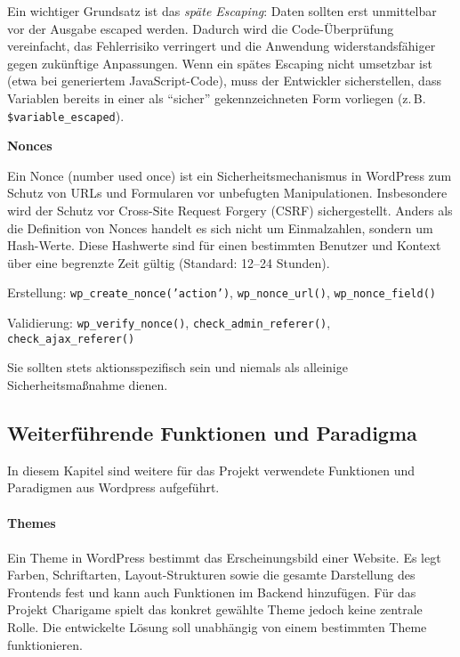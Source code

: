 Ein wichtiger Grundsatz ist das \emph{späte Escaping}: Daten sollten erst unmittelbar vor der Ausgabe escaped werden.
Dadurch wird die Code-Überprüfung vereinfacht, das Fehlerrisiko verringert und die Anwendung widerstandsfähiger gegen zukünftige Anpassungen.
Wenn ein spätes Escaping nicht umsetzbar ist (etwa bei generiertem JavaScript-Code), muss der Entwickler sicherstellen, dass Variablen bereits in einer als \enquote{sicher} gekennzeichneten Form vorliegen (z.\,B. \texttt{\$variable\_escaped}).

\textbf{Nonces}

Ein Nonce (number used once) ist ein Sicherheitsmechanismus in WordPress zum Schutz von URLs und Formularen vor unbefugten Manipulationen.
Insbesondere wird der Schutz vor Cross-Site Request Forgery (CSRF) sichergestellt.
Anders als die Definition von Nonces handelt es sich nicht um Einmalzahlen, sondern um Hash-Werte.
Diese Hashwerte sind für einen bestimmten Benutzer und Kontext über eine begrenzte Zeit gültig (Standard: 12–24 Stunden).

Erstellung: \texttt{wp\_create\_nonce('action')}, \texttt{wp\_nonce\_url()}, \texttt{wp\_nonce\_field()}

Validierung: \texttt{wp\_verify\_nonce()}, \texttt{check\_admin\_referer()}, \texttt{check\_ajax\_referer()}

Sie sollten stets aktionsspezifisch sein und niemals als alleinige Sicherheitsmaßnahme dienen.




\subsection{Weiterführende Funktionen und Paradigma}
In diesem Kapitel sind weitere für das Projekt verwendete Funktionen und Paradigmen aus Wordpress aufgeführt.
\\
\\
\textbf{Themes}\\\\
Ein Theme in WordPress bestimmt das Erscheinungsbild einer Website.
Es legt Farben, Schriftarten, Layout-Strukturen sowie die gesamte Darstellung des Frontends fest und kann auch Funktionen im Backend hinzufügen.
Für das Projekt Charigame spielt das konkret gewählte Theme jedoch keine zentrale Rolle.
Die entwickelte Lösung soll unabhängig von einem bestimmten Theme funktionieren.




